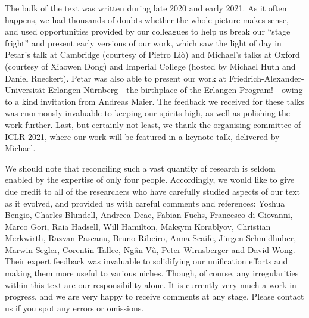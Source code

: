 The bulk of the text was written during late 2020 and early 2021. As it often happens, we had thousands of doubts whether  the whole picture makes sense, and used opportunities provided by our colleagues to  
%
help us break our ``stage fright'' and present early versions of our work, which saw the  
light of day in Petar's talk at Cambridge (courtesy of Pietro Li{\`o}) and Michael's talks at Oxford (courtesy of Xiaowen Dong) and Imperial College (hosted by Michael Huth and Daniel Rueckert). Petar was also able to present our work at Friedrich-Alexander-Universit\"{a}t Erlangen-N\"{u}rnberg---the birthplace of the Erlangen Program!---owing to a kind invitation from Andreas Maier.
%
%
The feedback we received for these talks was enormously invaluable to keeping our spirits high, as well as polishing the work further. 
Last, but certainly not least, we thank the organising committee of ICLR 2021, where our work will be featured in a keynote talk, delivered by Michael.



We should note that 
reconciling such a vast quantity of research is seldom enabled by the expertise of only four people. Accordingly, we would like to give due credit to all of the researchers who have carefully studied aspects of our text as it evolved, and provided us with careful comments and references: Yoshua Bengio, Charles Blundell, Andreea Deac, Fabian Fuchs, Francesco di Giovanni, Marco Gori, Raia Hadsell, Will Hamilton, Maksym Korablyov, Christian Merkwirth, Razvan Pascanu, Bruno Ribeiro, Anna Scaife, J\"{u}rgen Schmidhuber, Marwin Segler, Corentin Tallec, Ng\^{a}n V\~{u}, Peter Wirnsberger and David Wong. Their expert feedback was invaluable to solidifying our unification efforts and making them more useful to various niches. Though, of course, any irregularities within this text are our responsibility alone. It is currently very much a work-in-progress, and we are very happy to receive comments at any stage. Please contact us if you spot any errors or omissions.

